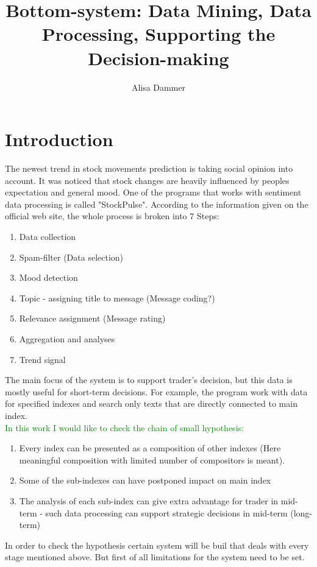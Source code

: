 \documentclass[11pt]{article}
\title{\textbf{Bottom-system: Data Mining, Data Processing, Supporting the Decision-making}}
\author{Alisa Dammer}
\begin{document}
\maketitle

\section{Introduction}
The newest trend in stock movements prediction is taking social opinion into account. It was noticed that stock changes are heavily influenced by peoples expectation and general mood.
One of the programs that works with sentiment data processing is called 
"StockPulse". According to the information given on the official web site, the whole process is broken into 7 Steps:\\
\begin{enumerate}
	\item Data collection
	\item Spam-filter (Data selection)
	\item Mood detection
	\item Topic - assigning title to message (Message coding?)
	\item Relevance assignment (Message rating)
	\item Aggregation and analyses
	\item Trend signal
\end{enumerate}
The main focus of the system is to support trader's decision, but this data is mostly useful for short-term decisions. For example, the program work with data for specified indexes and search only texts that are directly connected to main index.\\
\textcolor{green}{In this work I would like to check the chain of small hypothesis: }
\begin{enumerate}
	\item Every index can be presented as a composition of other indexes (Here meaningful composition with limited number of compositors is meant).
	\item Some of the sub-indexes can have postponed impact on main index 
	\item The analysis of each sub-index can give extra advantage for trader in mid-term - such data processing can support strategic decisions in mid-term (long-term)
\end{enumerate}
In order to check the hypothesis certain system will be buil that deals with every stage mentioned above. But first of all limitations for the system need to be set.
\end{document}
